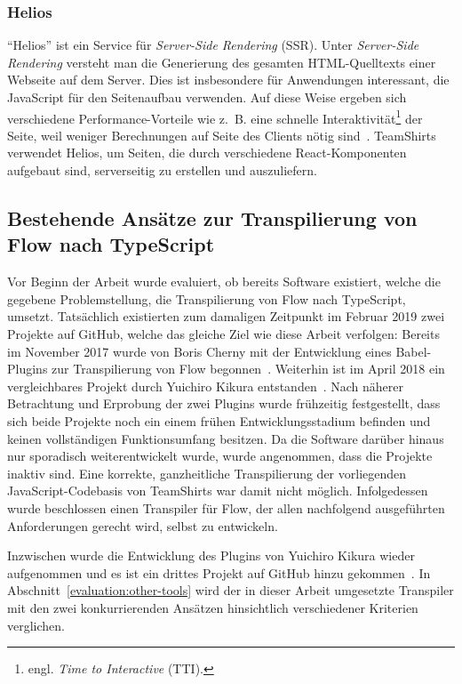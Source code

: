 \subsubsection{Helios}

\enquote{Helios} ist ein Service für \emph{Server-Side Rendering} (SSR). Unter \emph{Server-Side Rendering} versteht man die Generierung des gesamten HTML-Quelltexts einer Webseite auf dem Server. Dies ist insbesondere für Anwendungen interessant, die JavaScript für den Seitenaufbau verwenden. Auf diese Weise ergeben sich verschiedene Performance-Vorteile wie z.~B. eine schnelle Interaktivität\footnote{engl. \emph{Time to Interactive} (TTI).} der Seite, weil weniger Berechnungen auf Seite des Clients nötig sind~\autocite{GOOGLE:RENDERING_ON_THE_WEB}. TeamShirts verwendet Helios, um Seiten, die durch verschiedene React-Komponenten aufgebaut sind, serverseitig zu erstellen und auszuliefern.

\subsection{Bestehende Ansätze zur Transpilierung von Flow nach TypeScript}

Vor Beginn der Arbeit wurde evaluiert, ob bereits Software existiert, welche die gegebene Problemstellung, die Transpilierung von Flow nach TypeScript, umsetzt. Tatsächlich existierten zum damaligen Zeitpunkt im Februar 2019 zwei Projekte auf GitHub, welche das gleiche Ziel wie diese Arbeit verfolgen: Bereits im November 2017 wurde von Boris Cherny mit der Entwicklung eines Babel-Plugins zur Transpilierung von Flow begonnen~\autocite{CHERNY:FLOW_TO_TS}. Weiterhin ist im April 2018 ein vergleichbares Projekt durch Yuichiro Kikura entstanden~\autocite{KIKURA:FLOW_TO_TS}. Nach näherer Betrachtung und Erprobung der zwei Plugins wurde frühzeitig festgestellt, dass sich beide Projekte noch ein einem frühen Entwicklungsstadium befinden und keinen vollständigen Funktionsumfang besitzen. Da die Software darüber hinaus nur sporadisch weiterentwickelt wurde, wurde angenommen, dass die Projekte inaktiv sind. Eine korrekte, ganzheitliche Transpilierung der vorliegenden JavaScript-Codebasis von TeamShirts war damit nicht möglich. Infolgedessen wurde beschlossen einen Transpiler für Flow, der allen nachfolgend ausgeführten Anforderungen gerecht wird, selbst zu entwickeln.

Inzwischen wurde die Entwicklung des Plugins von Yuichiro Kikura wieder aufgenommen und es ist ein drittes Projekt auf GitHub hinzu gekommen~\autocite{KHAN:FLOW_TO_TS}. In Abschnitt~\ref{evaluation:other-tools} wird der in dieser Arbeit umgesetzte Transpiler mit den zwei konkurrierenden Ansätzen hinsichtlich verschiedener Kriterien verglichen.


